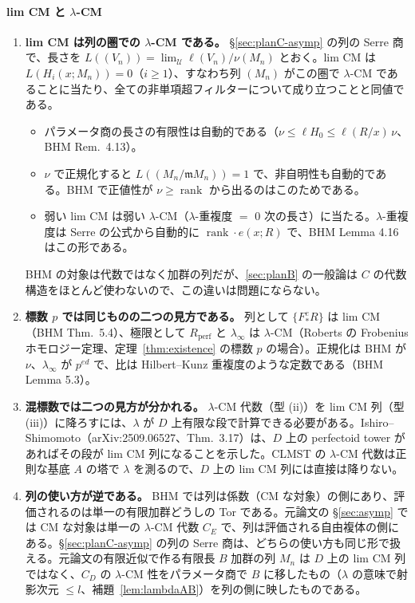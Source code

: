 \documentclass[11pt,a4paper]{ltjsarticle}
\numberwithin{equation}{section}
\theoremstyle{plain}
\theoremstyle{definition}
\theoremstyle{definition}
\newcommand{\m}{\mathfrak{m}}
\newcommand{\rank}{\operatorname{rank}}
\newcommand{\U}{\mathcal{U}}
\begin{document}
\paragraph{lim CM と $\lambda$-CM}
\begin{enumerate}
  \item \textbf{lim CM は列の圏での $\lambda$-CM である。} §\ref{sec:planC-asymp} の列の Serre 商で、長さを $L((V_n)) = \lim_\U\ell(V_n)/\nu(M_n)$ とおく。lim CM は $L(H_i(x;M_n)) = 0$（$i\ge1$）、すなわち列 $(M_n)$ がこの圏で $\lambda$-CM であることに当たり、全ての非単項超フィルターについて成り立つことと同値である。
  \begin{itemize}
    \item パラメータ商の長さの有限性は自動的である（$\nu\le\ell H_0\le\ell(R/x)\,\nu$、BHM Rem.~4.13）。
    \item $\nu$ で正規化すると $L((M_n/\m M_n)) = 1$ で、非自明性も自動的である。BHM で正値性が $\nu\ge\rank$ から出るのはこのためである。
    \item 弱い lim CM は弱い $\lambda$-CM（$\lambda$-重複度 $=$ $0$ 次の長さ）に当たる。$\lambda$-重複度は Serre の公式から自動的に $\rank\cdot e(x;R)$ で、BHM Lemma 4.16 はこの形である。
  \end{itemize}
  BHM の対象は代数ではなく加群の列だが、\ref{sec:planB} の一般論は $C$ の代数構造をほとんど使わないので、この違いは問題にならない。
  \item \textbf{標数 $p$ では同じものの二つの見方である。} 列として $\{F^e_*R\}$ は lim CM（BHM Thm.~5.4）、極限として $R_{\mathrm{perf}}$ と $\lambda_\infty$ は $\lambda$-CM（Roberts の Frobenius ホモロジー定理、定理~\ref{thm:existence} の標数 $p$ の場合）。正規化は BHM が $\nu$、$\lambda_\infty$ が $p^{ed}$ で、比は Hilbert--Kunz 重複度のような定数である（BHM Lemma 5.3）。
  \item \textbf{混標数では二つの見方が分かれる。} $\lambda$-CM 代数（型 (ii)）を lim CM 列（型 (iii)）に降ろすには、$\lambda$ が $D$ 上有限な段で計算できる必要がある。Ishiro--Shimomoto（arXiv:2509.06527、Thm.~3.17）は、$D$ 上の perfectoid tower があればその段が lim CM 列になることを示した。CLMST の $\lambda$-CM 代数は正則な基底 $A$ の塔で $\lambda$ を測るので、$D$ 上の lim CM 列には直接は降りない。
  \item \textbf{列の使い方が逆である。} BHM では列は係数（CM な対象）の側にあり、評価されるのは単一の有限加群どうしの Tor である。元論文の §\ref{sec:asymp} では CM な対象は単一の $\lambda$-CM 代数 $C_E$ で、列は評価される自由複体の側にある。§\ref{sec:planC-asymp} の列の Serre 商は、どちらの使い方も同じ形で扱える。元論文の有限近似で作る有限長 $B$ 加群の列 $M_n$ は $D$ 上の lim CM 列ではなく、$C_D$ の $\lambda$-CM 性をパラメータ商で $B$ に移したもの（$\lambda$ の意味で射影次元 $\le l$、補題~\ref{lem:lambdaAB}）を列の側に映したものである。
\end{enumerate}
\end{document}
